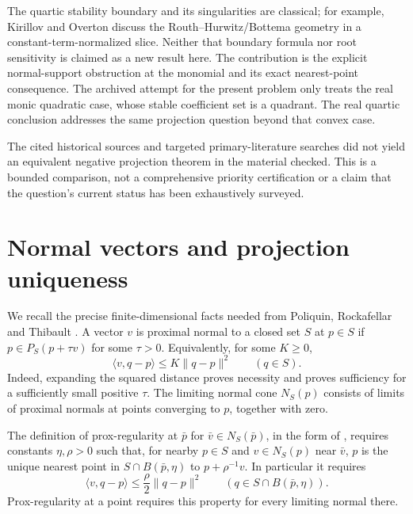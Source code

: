 \documentclass[11pt]{article}
\newcommand{\ip}[2]{\langle #1,#2\rangle}
\newcommand{\norm}[1]{\lVert #1\rVert}
\begin{document}
The quartic stability boundary and its singularities are classical; for example, Kirillov and Overton \cite[Section~1]{kirillov} discuss the Routh--Hurwitz/Bottema geometry in a constant-term-normalized slice. Neither that boundary formula nor root sensitivity is claimed as a new result here. The contribution is the explicit normal-support obstruction at the monomial and its exact nearest-point consequence. The archived attempt for the present problem only treats the real monic quadratic case, whose stable coefficient set is a quadrant. The real quartic conclusion addresses the same projection question beyond that convex case.

The cited historical sources and targeted primary-literature searches did not yield an equivalent negative projection theorem in the material checked. This is a bounded comparison, not a comprehensive priority certification or a claim that the question's current status has been exhaustively surveyed.

\section{Normal vectors and projection uniqueness}

We recall the precise finite-dimensional facts needed from Poliquin, Rockafellar and Thibault \cite{prt}. A vector \(v\) is proximal normal to a closed set \(S\) at \(p\in S\) if \(p\in P_S(p+\tau v)\) for some \(\tau>0\). Equivalently, for some \(K\geq0\),
\begin{equation}\label{eq:quadratic}
 \ip{v}{q-p}\leq K\norm{q-p}^2
 \qquad(q\in S).
\end{equation}
Indeed, expanding the squared distance proves necessity and proves sufficiency for a sufficiently small positive \(\tau\). The limiting normal cone \(N_S(p)\) consists of limits of proximal normals at points converging to \(p\), together with zero.

The definition of prox-regularity at \(\bar p\) for
\(\bar v\in N_S(\bar p)\), in the form of \cite[Definition~1.1]{prt}, requires constants \(\eta,\rho>0\) such that, for nearby \(p\in S\) and \(v\in N_S(p)\) near \(\bar v\), \(p\) is the unique nearest point in \(S\cap B(\bar p,\eta)\) to \(p+\rho^{-1}v\). In particular it requires
\begin{equation}\label{eq:uniform}
 \ip{v}{q-p}\leq \frac{\rho}{2}\norm{q-p}^2
 \qquad(q\in S\cap B(\bar p,\eta)).
\end{equation}
Prox-regularity at a point requires this property for every limiting normal there.
\end{document}
